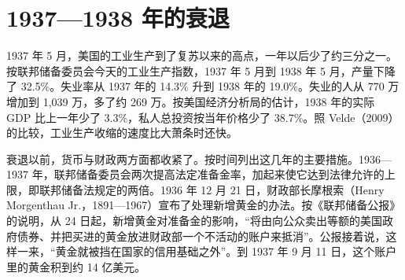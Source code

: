 \section{1937—1938 年的衰退}\label{sec:islm-1937}

1937 年 5 月，美国的工业生产到了复苏以来的高点，一年以后少了约三分之一。按联邦储备委员会今天的工业生产指数，1937 年 5 月到 1938 年 5 月，产量下降了 32.5\%\cite{frb2026ip}。失业率从 1937 年的 14.3\% 升到 1938 年的 19.0\%\cite{census1975a}。失业的人从 770 万增加到 1,039 万，多了约 269 万\cite{census1975a}。按美国经济分析局的估计，1938 年的实际 GDP 比上一年少了 3.3\%，私人总投资按当年价格少了 38.7\%\cite{bea2026}。照 Velde（2009）的比较，工业生产收缩的速度比大萧条时还快\cite{velde2009}。

衰退以前，货币与财政两方面都收紧了。按时间列出这几年的主要措施。1936—1937 年，联邦储备委员会两次提高法定准备金率，加起来使它达到法律允许的上限，即联邦储备法规定的两倍\cite{frb1937a}。1936 年 12 月 21 日，财政部长摩根索（Henry Morgenthau Jr.，1891—1967）宣布了处理新增黄金的办法\cite{frb1937jan,treasury33,loc33}。按《联邦储备公报》的说明，从 24 日起，新增黄金对准备金的影响，“将由向公众卖出等额的美国政府债券、并把买进的黄金放进财政部一个不活动的账户来抵消”\cite{frb1937jan,frb1937a}。公报接着说，这样一来，“黄金就被挡在国家的信用基础之外”\cite{frb1937jan}。到 1937 年 9 月 11 日，这个账户里的黄金积到约 14 亿美元\cite{frb1938may}。

